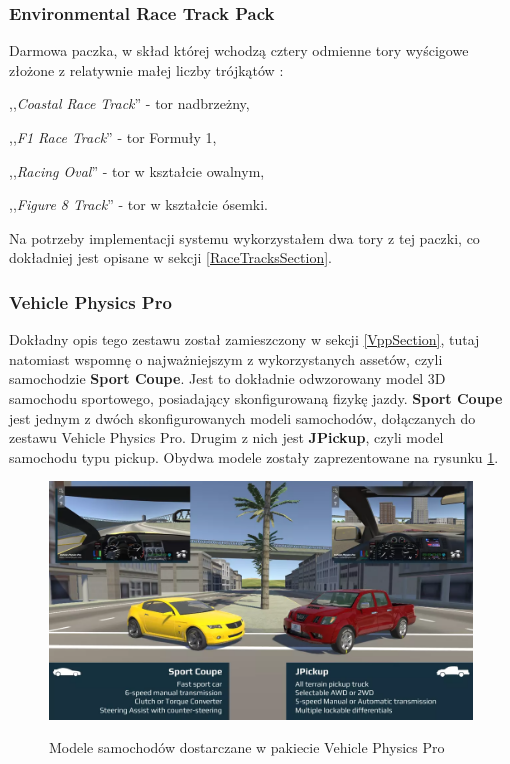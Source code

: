 \subsubsection{Environmental Race Track Pack}
Darmowa paczka, w skład której wchodzą cztery odmienne tory wyścigowe złożone z relatywnie małej liczby trójkątów \cite{unityAssets:envRaceTrackPack}:
\vspace{-0.5cm}
\begin{itemize*}
\item ,,\textit{Coastal Race Track}'' - tor nadbrzeżny,
\item ,,\textit{F1 Race Track}'' - tor Formuły 1,
\item ,,\textit{Racing Oval}'' - tor w kształcie owalnym,
\item ,,\textit{Figure 8 Track}'' - tor w kształcie ósemki.
\end{itemize*}
Na potrzeby implementacji systemu wykorzystałem dwa tory z tej paczki, co dokładniej jest opisane w sekcji \ref{RaceTracksSection}.

\subsubsection{Vehicle Physics Pro}
Dokładny opis tego zestawu został zamieszczony w sekcji \ref{VppSection}, tutaj natomiast wspomnę o najważniejszym z wykorzystanych assetów, czyli samochodzie \textbf{Sport Coupe}. Jest to dokładnie odwzorowany model 3D samochodu sportowego, posiadający skonfigurowaną fizykę jazdy. \textbf{Sport Coupe} jest jednym z dwóch skonfigurowanych modeli samochodów, dołączanych do zestawu Vehicle Physics Pro. Drugim z nich jest \textbf{JPickup}, czyli model samochodu typu pickup. Obydwa modele zostały zaprezentowane na rysunku \ref{VppCarModels}. \\

\begin{figure}[h]
\begin{center}
\includegraphics[width=14cm]{resources/figures/vpp-car-models.png}
\caption{Modele samochodów dostarczane w pakiecie Vehicle Physics Pro}
\label{VppCarModels}
\end{center}
\end{figure}

